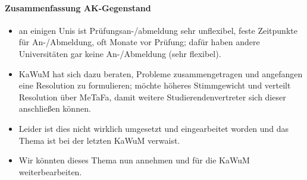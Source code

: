     \paragraph{Zusammenfassung AK-Gegenstand}
      \begin{itemize}
        \item an einigen Unis ist Prüfungsan-/abmeldung sehr unflexibel, feste Zeitpunkte für An-/Abmeldung, oft Monate vor Prüfung; dafür haben andere Universitäten gar keine An-/Abmeldung (sehr flexibel).
        \item KaWuM hat sich dazu beraten, Probleme zusammengetragen und angefangen eine Resolution zu formulieren; möchte höheres Stimmgewicht und verteilt Resolution über MeTaFa, damit weitere Studierendenvertreter sich dieser anschließen können.
        \item Leider ist dies nicht wirklich umgesetzt und eingearbeitet worden und das Thema ist bei der letzten KaWuM verwaist.
        \item Wir könnten dieses Thema nun annehmen und für die KaWuM weiterbearbeiten.
      \end{itemize}

